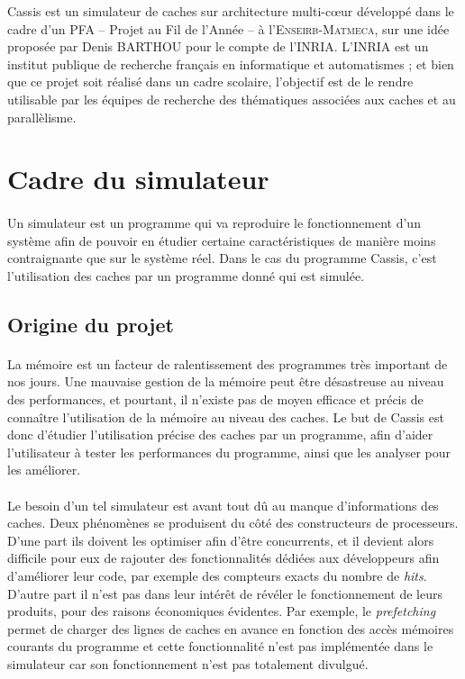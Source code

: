 \textsf{Cassis} est un simulateur de caches sur architecture multi-c\oe ur développé dans le cadre d'un PFA -- Projet au Fil de l'Année -- à l'\textsc{Enseirb-Matmeca}, sur une idée proposée par Denis BARTHOU pour le compte de l'\textsf{INRIA}. L'\textsf{INRIA} est un institut publique de recherche français en informatique et automatismes ; et bien que ce projet soit réalisé dans un cadre scolaire, l'objectif est de le rendre utilisable par les équipes de recherche des thématiques associées aux caches et au parallèlisme.

\section{Cadre du simulateur}

\paragraph{}
Un simulateur est un programme qui va reproduire le fonctionnement d'un système afin de pouvoir en étudier certaine caractéristiques de manière moins contraignante que sur le système réel. Dans le cas du programme \textsf{Cassis}, c'est l'utilisation des caches par un programme donné qui est simulée.

\subsection{Origine du projet}

\paragraph{}
La mémoire est un facteur de ralentissement des programmes très important de nos jours. Une mauvaise gestion de la mémoire peut être désastreuse au niveau des performances, et pourtant, il n'existe pas de moyen efficace et précis de connaître l'utilisation de la mémoire au niveau des caches. Le but de \textsf{Cassis} est donc d'étudier l'utilisation précise des caches par un programme, afin d'aider l'utilisateur à tester les performances du programme, ainsi que les analyser pour les améliorer.

\paragraph{}
Le besoin d'un tel simulateur est avant tout dû au manque d'informations des caches. Deux phénomènes se produisent du côté des constructeurs de processeurs. D'une part ils doivent les optimiser afin d'être concurrents, et il devient alors difficile pour eux de rajouter des fonctionnalités dédiées aux développeurs afin d'améliorer leur code, par exemple des compteurs exacts du nombre de \emph{hits}. D'autre part il n'est pas dans leur intérêt de révéler le fonctionnement de leurs produits, pour des raisons économiques évidentes. Par exemple, le \emph{prefetching} permet de charger des lignes de caches en avance en fonction des accès mémoires courants du programme et cette fonctionnalité n'est pas implémentée dans le simulateur car son fonctionnement n'est pas totalement divulgué.

